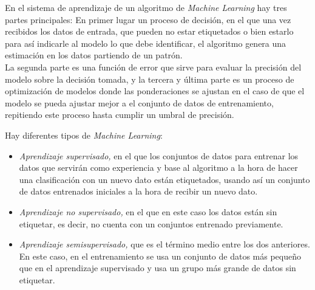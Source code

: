 En el sistema de aprendizaje de un algoritmo de \textit{Machine Learning} hay tres partes principales: En primer lugar un proceso de decisión, en el que una vez recibidos los datos de entrada, que pueden no estar etiquetados o bien estarlo para así indicarle al modelo lo que debe identificar, el algoritmo genera una estimación en los datos partiendo de un patrón.\\
La segunda parte es una función de error que sirve para evaluar la precisión del modelo sobre la decisión tomada, y la tercera y última parte es un proceso de optimización de modelos donde las ponderaciones se ajustan en el caso de que el modelo se pueda ajustar mejor a el conjunto de datos de entrenamiento, repitiendo este proceso hasta cumplir un umbral de precisión.

Hay diferentes tipos de \textit{Machine Learning}:
\begin{itemize}
 \item \textit{Aprendizaje supervisado,} en el que los conjuntos de datos para entrenar los datos que servirán como experiencia y base al algoritmo a la hora de hacer una clasificación con un nuevo dato están etiquetados, usando así un conjunto de datos entrenados iniciales a la hora de recibir un nuevo dato.
 \item \textit{Aprendizaje no supervisado,} en el que en este caso los datos están sin etiquetar, es decir, no cuenta con un conjuntos entrenado previamente.
 \item \textit{Aprendizaje semisupervisado,} que es el término medio entre los dos anteriores. En este caso, en el entrenamiento se usa un conjunto de datos más pequeño que en el aprendizaje supervisado y usa un grupo más grande de datos sin etiquetar.
\end{itemize}\

